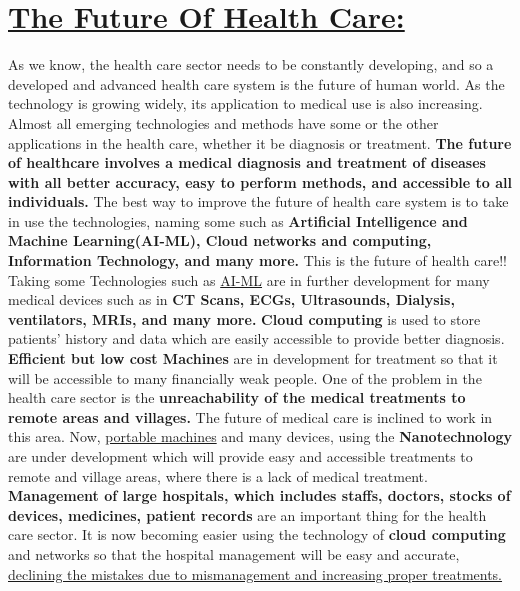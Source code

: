 \documentclass[18pt]{article}
\begin{document}
\section{\underline{The Future Of Health Care:}}
As we know, the health care sector needs to be constantly developing, and so a developed and advanced health care system is the future of human world. As the technology is growing widely, its application to medical use is also increasing. Almost all emerging technologies and methods have some or the other applications in the health care, whether it be diagnosis or treatment.\newline
\textbf{The future of healthcare involves a medical diagnosis and treatment of diseases with all better accuracy, easy to perform methods, and accessible to all individuals.}
\newline The best way to improve the future of health care system is to take in use the technologies, naming some such as \textbf{Artificial Intelligence and Machine Learning(AI-ML), Cloud networks and computing, Information Technology, and many more.} This is the future of health care!!
Taking some Technologies such as \underline{AI-ML} are in further development for many medical devices such as in \textbf{CT Scans, ECGs, Ultrasounds, Dialysis, ventilators, MRIs, and many more.}\newline
\textbf{Cloud computing} is used to store patients’ history and data which are easily accessible to provide better diagnosis.
\newline \textbf{Efficient but low cost Machines} are in development for treatment so that it will be accessible to many financially weak people. 
\newline One of the problem in the health care sector is the \textbf{unreachability of the medical treatments to remote areas and villages.} The future of medical care is inclined to work in this area. \newline Now, \underline{portable machines} and many devices, using the \textbf{Nanotechnology} are under development which will provide easy and accessible treatments to remote and village areas, where there is a lack of medical treatment.
\newline \textbf{Management of large hospitals, which includes staffs, doctors, stocks of devices, medicines, patient records} are an important thing for the health care sector. It is now becoming easier using the technology of \textbf{cloud computing} and networks so that the hospital management will be easy and accurate, \underline{declining the mistakes due to mismanagement and increasing proper treatments. } 
\end{document}
